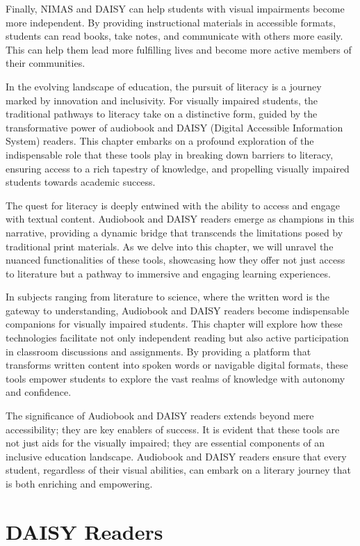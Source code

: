 \documentclass[12pt,letterpaper,twoside,openright]{report}
\begin{document}
Finally, NIMAS and DAISY can help students with visual impairments become more independent. By providing instructional materials in accessible formats, students can read books, take notes, and communicate with others more easily. This can help them lead more fulfilling lives and become more active members of their communities.

In the evolving landscape of education, the pursuit of literacy is a journey marked by innovation and inclusivity. For visually impaired students, the traditional pathways to literacy take on a distinctive form, guided by the transformative power of audiobook and DAISY (Digital Accessible Information System) readers. This chapter embarks on a profound exploration of the indispensable role that these tools play in breaking down barriers to literacy, ensuring access to a rich tapestry of knowledge, and propelling visually impaired students towards academic success.

The quest for literacy is deeply entwined with the ability to access and engage with textual content. Audiobook and DAISY readers emerge as champions in this narrative, providing a dynamic bridge that transcends the limitations posed by traditional print materials. As we delve into this chapter, we will unravel the nuanced functionalities of these tools, showcasing how they offer not just access to literature but a pathway to immersive and engaging learning experiences.

In subjects ranging from literature to science, where the written word is the gateway to understanding, Audiobook and DAISY readers become indispensable companions for visually impaired students. This chapter will explore how these technologies facilitate not only independent reading but also active participation in classroom discussions and assignments. By providing a platform that transforms written content into spoken words or navigable digital formats, these tools empower students to explore the vast realms of knowledge with autonomy and confidence.

The significance of Audiobook and DAISY readers extends beyond mere accessibility; they are key enablers of success. It is evident that these tools are not just aids for the visually impaired; they are essential components of an inclusive education landscape. Audiobook and DAISY readers ensure that every student, regardless of their visual abilities, can embark on a literary journey that is both enriching and empowering.

\pagebreak \hypertarget{text-to-speech-music-podcast}{}\section{DAISY Readers}\label{text-to-speech-music-podcast}
\end{document}
